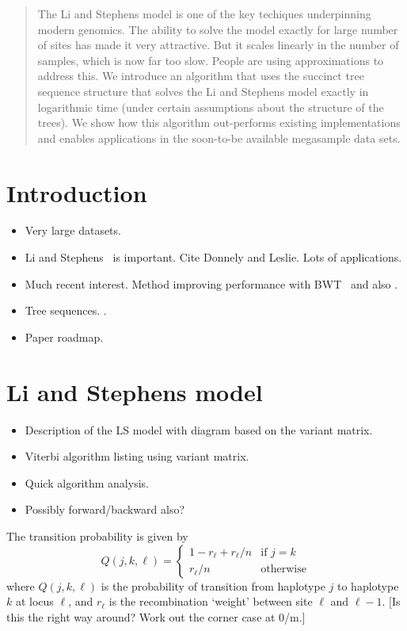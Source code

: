 \documentclass{article}
\begin{document}
\begin{abstract}
The Li and Stephens model is one of the key techiques underpinning modern
genomics. The ability to solve the model exactly for large number of
sites has made it very attractive. But it scales linearly in the number
of samples, which is now far too slow. People are using approximations
to address this. We introduce an algorithm that uses the succinct
tree sequence structure that solves the Li and Stephens model exactly
in logarithmic time (under certain assumptions about the structure
of the trees). We show how this algorithm out-performs existing implementations
and enables applications in the soon-to-be available megasample data sets.

\end{abstract}


\section{Introduction}

\begin{itemize}
\item Very large datasets.
\item Li and Stephens~\citep{li2003modeling,donnelly2010coalescent} is important. Cite Donnely and
Leslie. Lots of applications.
\item Much recent interest. Method improving performance with BWT~\citep{lunter2018haplotype}
and also \citep{rosen2018average}.
\item Tree sequences.
\citep{kelleher2016efficient,kelleher2018efficient,kelleher2018inferring,haller2018tree}.
\item Paper roadmap.
\end{itemize}

\section{Li and Stephens model}

\begin{itemize}
\item Description of the LS model with diagram based on the variant matrix.
\item Viterbi algorithm listing using variant matrix.
\item Quick algorithm analysis.
\item Possibly forward/backward also?
\end{itemize}

The transition probability is given by
\begin{equation}\label{eq-recomb-proba}
Q(j, k, \ell) = \begin{cases}
1 - r_\ell + r_\ell / n & \text{if $j = k$} \\
r_\ell / n & \text{otherwise}
\end{cases}
\end{equation}
where $Q(j, k, \ell)$ is the probability of transition from haplotype $j$
to haplotype $k$ at locus $\ell$, and $r_\ell$ is the recombination `weight'
between site $\ell$ and $\ell - 1$. [Is this the right way around? Work out
the corner case at 0/m.]
\end{document}
